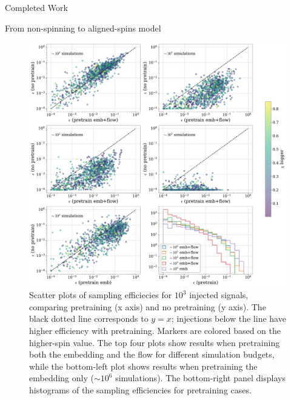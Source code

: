 \documentclass[11pt,a4paper,oneside]{book}
\numberwithin{equation}{chapter}
\numberwithin{table}{chapter}
\numberwithin{figure}{chapter}
\begin{document}
\begin{chapter}{Completed Work}
\begin{section}{From non-spinning to aligned-spins model}
\begin{figure}
\includegraphics[width=1.1\columnwidth]{figures/neff.pdf}
\caption{Scatter plots of sampling efficiecies  for $10^{3}$ injected signals, comparing pretraining (x axis) and no pretraining (y axis). The black dotted line corresponds to $y=x$; injections below the line have higher efficiency with pretraining. Markers are colored based on the higher-spin value. The top four plots show results when pretraining both the embedding and the flow for different simulation budgets, while the bottom-left plot shows results when pretraining the embedding only ($\sim 10^{6}$ simulations). The bottom-right panel displays histograms of the sampling efficiencies for pretraining cases.}
\label{eff}
\end{figure}







\end{section}



\end{chapter}
\end{document}
